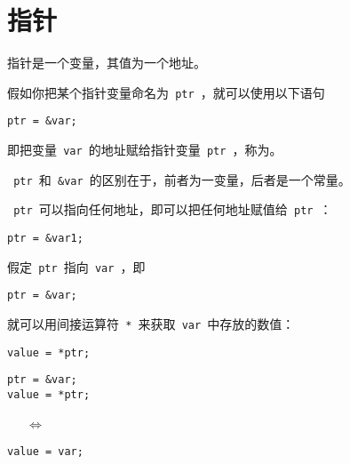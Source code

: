 \section{指针}
\begin{frame}[fragile]\ft{\secname}
指针是一个变量，其值为一个地址。
\end{frame}

\begin{frame}[fragile]\ft{\secname}
假如你把某个指针变量命名为\lstinline| ptr |，就可以使用以下语句
\begin{lstlisting}[backgroundcolor=\color{blue!10}]
ptr = &var;
\end{lstlisting}
即把变量\lstinline| var |的地址赋给指针变量\lstinline| ptr |，称为。
\pause \vspace{0.1in}

\lstinline| ptr |和\lstinline| &var |的区别在于，前者为一变量，后者是一个常量。
\end{frame}

\begin{frame}[fragile]\ft{\secname}
\lstinline| ptr |可以指向任何地址，即可以把任何地址赋值给\lstinline| ptr |：
\begin{lstlisting}[backgroundcolor=\color{blue!10}]
ptr = &var1;
\end{lstlisting}
\end{frame}


\begin{frame}[fragile]
假定\lstinline| ptr |指向\lstinline| var |，即
\begin{lstlisting}[backgroundcolor=\color{blue!10}]
ptr = &var;
\end{lstlisting}
就可以用间接运算符\lstinline| * |来获取\lstinline| var |中存放的数值：
\begin{lstlisting}[backgroundcolor=\color{blue!10}]
value = *ptr;
\end{lstlisting}
\pause \vspace{0.1in}

\begin{minipage}{0.4\textwidth}
\begin{lstlisting}[backgroundcolor=\color{blue!10}]
ptr = &var;
value = *ptr;
\end{lstlisting}
\end{minipage}
~~~$\Longleftrightarrow$~~~
\begin{minipage}{0.4\textwidth}
\begin{lstlisting}[backgroundcolor=\color{blue!10}]
value = var;
\end{lstlisting}
\end{minipage}
\end{frame}

